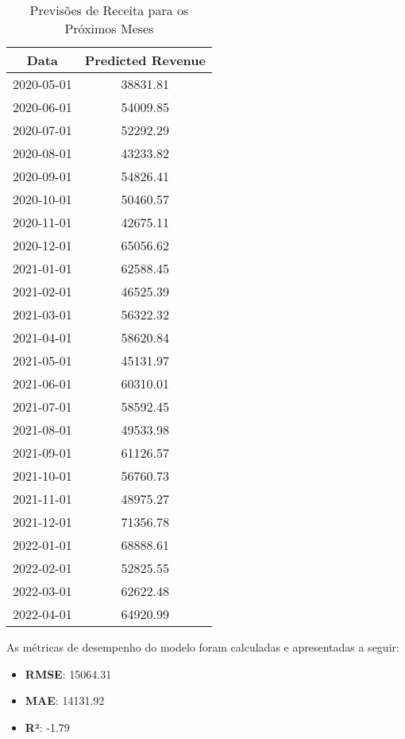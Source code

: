 \documentclass[a4paper,12pt]{article}
\begin{document}
\begin{table}[H]
    \centering
    \caption{Previsões de Receita para os Próximos Meses}
    \begin{tabular}{|c|c|}
        \hline
        \textbf{Data} & \textbf{Predicted Revenue} \\
        \hline
        2020-05-01 & 38831.81 \\
        2020-06-01 & 54009.85 \\
        2020-07-01 & 52292.29 \\
        2020-08-01 & 43233.82 \\
        2020-09-01 & 54826.41 \\
        2020-10-01 & 50460.57 \\
        2020-11-01 & 42675.11 \\
        2020-12-01 & 65056.62 \\
        2021-01-01 & 62588.45 \\
        2021-02-01 & 46525.39 \\
        2021-03-01 & 56322.32 \\
        2021-04-01 & 58620.84 \\
        2021-05-01 & 45131.97 \\
        2021-06-01 & 60310.01 \\
        2021-07-01 & 58592.45 \\
        2021-08-01 & 49533.98 \\
        2021-09-01 & 61126.57 \\
        2021-10-01 & 56760.73 \\
        2021-11-01 & 48975.27 \\
        2021-12-01 & 71356.78 \\
        2022-01-01 & 68888.61 \\
        2022-02-01 & 52825.55 \\
        2022-03-01 & 62622.48 \\
        2022-04-01 & 64920.99 \\
        \hline
    \end{tabular}
\end{table}

As métricas de desempenho do modelo foram calculadas e apresentadas a seguir:

\begin{itemize}
    \item \textbf{RMSE}: 15064.31
    \item \textbf{MAE}: 14131.92
    \item \textbf{R²}: -1.79
\end{itemize}
\end{document}
